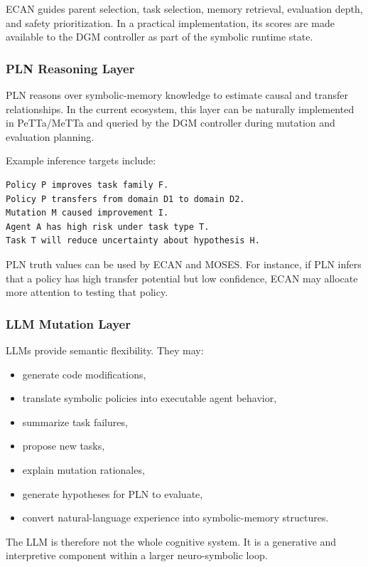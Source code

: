 \documentclass[11pt]{article}
\begin{document}
ECAN guides parent selection, task selection, memory retrieval, evaluation depth, and safety prioritization. In a practical implementation, its scores are made available to the DGM controller as part of the symbolic runtime state.

\subsubsection{PLN Reasoning Layer}

PLN reasons over symbolic-memory knowledge to estimate causal and transfer relationships. In the current ecosystem, this layer can be naturally implemented in PeTTa/MeTTa and queried by the DGM controller during mutation and evaluation planning.

Example inference targets include:

\begin{verbatim}
Policy P improves task family F.
Policy P transfers from domain D1 to domain D2.
Mutation M caused improvement I.
Agent A has high risk under task type T.
Task T will reduce uncertainty about hypothesis H.
\end{verbatim}

PLN truth values can be used by ECAN and MOSES. For instance, if PLN infers that a policy has high transfer potential but low confidence, ECAN may allocate more attention to testing that policy.

\subsubsection{LLM Mutation Layer}

LLMs provide semantic flexibility. They may:

\begin{itemize}[leftmargin=*]
    \item generate code modifications,
    \item translate symbolic policies into executable agent behavior,
    \item summarize task failures,
    \item propose new tasks,
    \item explain mutation rationales,
    \item generate hypotheses for PLN to evaluate,
    \item convert natural-language experience into symbolic-memory structures.
\end{itemize}

The LLM is therefore not the whole cognitive system. It is a generative and interpretive component within a larger neuro-symbolic loop.
\end{document}
